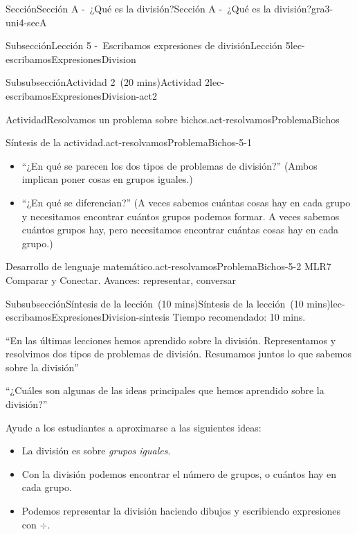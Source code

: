 \documentclass[oneside,10pt,]{article}
\begin{document}
\begin{sectionptx}{Sección}{Sección A -~¿Qué es la división?}{}{Sección A -~¿Qué es la división?}{}{}{gra3-uni4-secA}
\begin{subsectionptx}{Subsección}{Lección 5 -~Escribamos expresiones de división}{}{Lección 5}{}{}{lec-escribamosExpresionesDivision}
\begin{subsubsectionptx}{Subsubsección}{Actividad 2~(20 mins)}{}{Actividad 2}{}{}{lec-escribamosExpresionesDivision-act2}
\begin{activity}{Actividad}{Resolvamos un problema sobre bichos.}{act-resolvamosProblemaBichos}
\begin{enumerate}[label={\Alph*.}]
\end{enumerate}
%
\end{activity}%
\par
\begin{paragraphs}{Síntesis de la actividad.}{act-resolvamosProblemaBichos-5-1}%
%
\begin{itemize}[label=\textbullet]
\item{}``¿En qué se parecen los dos tipos de problemas de división?'' (Ambos implican poner cosas en grupos iguales.)%
\item{}``¿En qué se diferencian?'' (A veces sabemos cuántas cosas hay en cada grupo y necesitamos encontrar cuántos grupos podemos formar. A veces sabemos cuántos grupos hay, pero necesitamos encontrar cuántas cosas hay en cada grupo.)%
\end{itemize}
\end{paragraphs}%
\begin{paragraphs}{Desarrollo de lenguaje matemático.}{act-resolvamosProblemaBichos-5-2}%
MLR7 Comparar y Conectar. Avances: representar, conversar%
\end{paragraphs}%
\end{subsubsectionptx}
%
%
\typeout{************************************************}
\typeout{************************************************}
%
\begin{subsubsectionptx}{Subsubsección}{Síntesis de la lección~(10 mins)}{}{Síntesis de la lección~(10 mins)}{}{}{lec-escribamosExpresionesDivision-sintesis}
Tiempo recomendado: 10 mins.%
\par
``En las últimas lecciones hemos aprendido sobre la división. Representamos y resolvimos dos tipos de problemas de división. Resumamos juntos lo que sabemos sobre la división''%
\par
``¿Cuáles son algunas de las ideas principales que hemos aprendido sobre la división?''%
\par
Ayude a los estudiantes a aproximarse a las siguientes ideas:%
\begin{itemize}[label=\textbullet]
\item{}La división es sobre \emph{grupos iguales}.%
\item{}Con la división podemos encontrar el número de grupos, o cuántos hay en cada grupo.%
\item{}Podemos representar la división haciendo dibujos y escribiendo expresiones con \(\div\).%
\end{itemize}
%
\par

\end{subsubsectionptx}
\end{subsectionptx}
\end{sectionptx}
\end{document}
